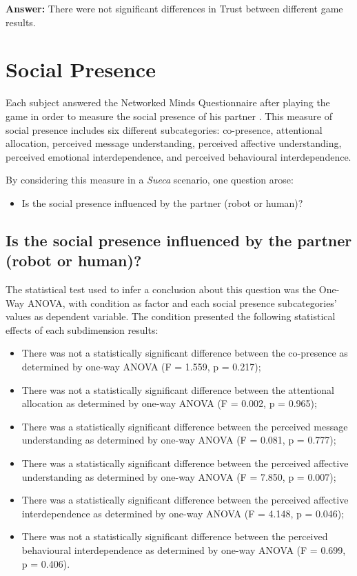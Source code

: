 \textbf{Answer:} There were not significant differences in Trust between different game results.


\section{Social Presence}
\label{sec:socialPresence}
Each subject answered the Networked Minds Questionnaire after playing the game in order to measure the social presence of his partner \cite{Harms2004}.
This measure of social presence includes six different subcategories: co-presence, attentional allocation, perceived message understanding, perceived affective understanding, perceived emotional interdependence, and perceived behavioural interdependence.

By considering this measure in a \emph{Sueca} scenario, one question arose:
\begin{itemize}
\item Is the social presence influenced by the partner (robot or human)?
\end{itemize}

\subsection*{Is the social presence influenced by the partner (robot or human)?}
The statistical test used to infer a conclusion about this question was the One-Way ANOVA, with condition as factor and each social presence subcategories' values as dependent variable.
The condition presented the following statistical effects of each subdimension results:
\begin{itemize}
\item There was not a statistically significant difference between the co-presence as determined by one-way ANOVA (F = 1.559, p = 0.217);
\item There was not a statistically significant difference between the attentional allocation as determined by one-way ANOVA (F = 0.002, p = 0.965);
\item There was a statistically significant difference between the perceived message understanding as determined by one-way ANOVA (F = 0.081, p = 0.777);
\item There was a statistically significant difference between the perceived affective understanding as determined by one-way ANOVA (F = 7.850, p = 0.007);
\item There was a statistically significant difference between the perceived affective interdependence as determined by one-way ANOVA (F = 4.148, p = 0.046);
\item There was not a statistically significant difference between the perceived behavioural interdependence as determined by one-way ANOVA (F = 0.699, p = 0.406).
\end{itemize}

